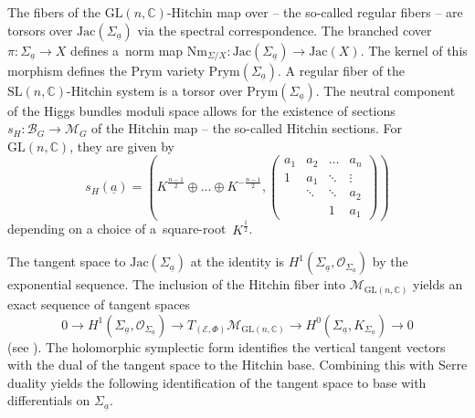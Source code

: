 \documentclass[pdftex]{sigma}
\numberwithin{equation}{section}
\theoremstyle{definition}
\newcommand{\reg}{\mathrm{reg}}
\newcommand{\Jac}{\mathrm{Jac}}
\renewcommand{\to}{\rightarrow}
\newcommand{\calB}{\mathcal{B}}
\newcommand{\calE}{\mathcal{E}}
\newcommand{\calM}{\mathcal{M}}
\newcommand{\calO}{\mathcal{O}}
\newcommand{\CC}{\mathbb{C}}
\newcommand{\Prym}{\mathrm{Prym}}
\newcommand{\Nm}{\mathrm{Nm}}
\newcommand{\GL}{\mathrm{GL}}
\newcommand{\SL}{\mathrm{SL}}
\begin{document}
The fibers of the $\GL(n,\CC)$-Hitchin map over \smash{$\calB_{\GL(n,\CC)}^{\reg}$} -- the so-called regular fibers -- are torsors over $\Jac(\Sigma_{\underline{a}})$ via the spectral correspondence. The branched cover $\pi\colon \Sigma_{\underline{a}} \to X$ defines a~norm map $\Nm_{\Sigma/X}\colon \Jac(\Sigma_{\underline{a}}) \to \Jac(X)$. The kernel of this morphism defines the Prym variety $\Prym(\Sigma_{\underline{a}})$. A regular fiber of the $\SL(n,\CC)$-Hitchin system is a torsor over $\Prym(\Sigma_{\underline{a}})$. The neutral component of the Higgs bundles moduli space allows for the existence of sections $s_H\colon \calB_G \to \calM_G$ of the Hitchin map -- the so-called Hitchin sections. For $\GL(n,\CC)$, they are given by
\[ s_H(\underline{a})=\left( K^{\frac{n-1}{2}} \oplus \dots \oplus K^{-\frac{n-1}{2}}, \begin{pmatrix} a_1 & a_2 & \dots & a_n \\ 1 & a_1 & \ddots & \vdots \\ & \ddots & \ddots & a_2 \\ &&1& a_1 \end{pmatrix} \right)
\] depending on a choice of a~square-root~$K^{\frac{1}{2}}$.

The tangent space to $\Jac(\Sigma_{\underline{a}})$ at the identity is $H^1(\Sigma_{\underline{a}},\calO_{\Sigma_{\underline{a}}})$ by the exponential sequence. The inclusion of the Hitchin fiber into $\calM_{\GL(n,\CC)}$ yields an exact sequence of tangent spaces
\[ 0 \to H^1(\Sigma_{\underline{a}},\calO_{\Sigma_{\underline{a}}}) \to T_{(\calE,\Phi)}\calM_{\GL(n,\CC)} \to H^0(\Sigma_{\underline{a}},K_{\Sigma_{\underline{a}}}) \to 0
\]
(see \cite[Proposition~8.2]{Markman}).
The holomorphic symplectic form identifies the vertical tangent vectors with the dual of the tangent space to the Hitchin base. Combining this with Serre duality yields the following identification of the tangent space to base with differentials on $\Sigma_{\underline{a}}$.
\end{document}
